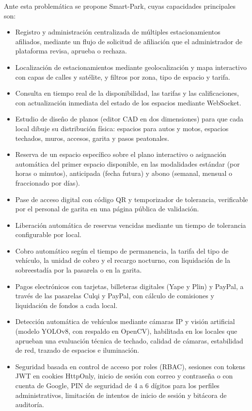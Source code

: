 Ante esta problemática se propone Smart-Park, cuyas capacidades principales son:

\begin{itemize}
    \item Registro y administración centralizada de múltiples estacionamientos afiliados, mediante un flujo de solicitud de afiliación que el administrador de plataforma revisa, aprueba o rechaza.
    \item Localización de estacionamientos mediante geolocalización y mapa interactivo con capas de calles y satélite, y filtros por zona, tipo de espacio y tarifa.
    \item Consulta en tiempo real de la disponibilidad, las tarifas y las calificaciones, con actualización inmediata del estado de los espacios mediante WebSocket.
    \item Estudio de diseño de planos (editor CAD en dos dimensiones) para que cada local dibuje su distribución física: espacios para autos y motos, espacios techados, muros, accesos, garita y pasos peatonales.
    \item Reserva de un espacio específico sobre el plano interactivo o asignación automática del primer espacio disponible, en las modalidades estándar (por horas o minutos), anticipada (fecha futura) y abono (semanal, mensual o fraccionado por días).
    \item Pase de acceso digital con código QR y temporizador de tolerancia, verificable por el personal de garita en una página pública de validación.
    \item Liberación automática de reservas vencidas mediante un tiempo de tolerancia configurable por local.
    \item Cobro automático según el tiempo de permanencia, la tarifa del tipo de vehículo, la unidad de cobro y el recargo nocturno, con liquidación de la sobreestadía por la pasarela o en la garita.
    \item Pagos electrónicos con tarjetas, billeteras digitales (Yape y Plin) y PayPal, a través de las pasarelas Culqi y PayPal, con cálculo de comisiones y liquidación de fondos a cada local.
    \item Detección automática de vehículos mediante cámaras IP y visión artificial (modelo YOLOv8, con respaldo en OpenCV), habilitada en los locales que aprueban una evaluación técnica de techado, calidad de cámaras, estabilidad de red, trazado de espacios e iluminación.
    \item Seguridad basada en control de acceso por roles (RBAC), sesiones con tokens JWT en cookies HttpOnly, inicio de sesión con correo y contraseña o con cuenta de Google, PIN de seguridad de 4 a 6 dígitos para los perfiles administrativos, limitación de intentos de inicio de sesión y bitácora de auditoría.

\end{itemize}
